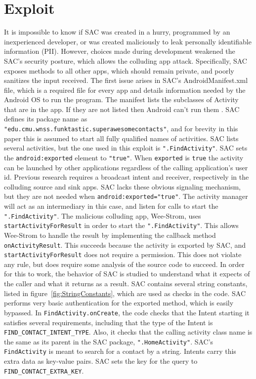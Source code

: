 \documentclass[conference,compsoc]{IEEEtran}
\begin{document}
\section{Exploit}
It is impossible to know if SAC was created in a hurry, programmed by an inexperienced developer, or was created maliciously to leak personally identifiable information (PII). However, choices made during development weakened the SAC's security posture, which allows the colluding app attack. Specifically, SAC exposes methods to all other apps, which should remain private, and poorly sanitizes the input received.
\newline
\indent The first issue arises in SAC's AndroidManifest.xml file, which is a required file for every app and details information needed by the Android OS to run the program\cite{Google:AppManifest}. The manifest lists the subclasses of Activity that are in the app. If they are not listed then Android can't run them \cite{Google:ActivityElement}. SAC defines its package name as \texttt{"edu.cmu.wnss.\-funktastic.\-superawesomecontacts"}, and for brevity in this paper this is assumed to start all fully qualified names of activities.
\newline
\indent	SAC lists several activities, but the one used in this exploit is \texttt{".FindActivity"}. SAC sets the \texttt{android:exported} element to \texttt{"true"}. When \texttt{exported} is \texttt{true} the activity can be launched by other applications regardless of the calling application's user id\cite{Google:ActivityElement}. Previous research requires a broadcast intent and receiver, respectively in the colluding source and sink apps\cite{marforio2010application}. SAC lacks these obvious signaling mechanism, but they are not needed when \texttt{android:exported="true"}. The activity manager will act as an intermediary in this case, and listen for calls to start the \texttt{".FindActivity"}.
\newline
\indent The malicious colluding app, Wee-Strom, uses \texttt{startActivityForResult} in order to start the \texttt{".FindActivity"}. This allows Wee-Strom to handle the result by implementing the callback method \texttt{onActivityResult}\cite{Google:startActivityForResult}. This succeeds because the activity is exported by SAC, and \texttt{startActivityForResult} does not require a permission. This does not violate any rule, but does require some analysis of the source code to succeed.
\newline
\indent In order for this to work, the behavior of SAC is studied to understand what it expects of the caller and what it returns as a result. SAC contains several string constants, listed in figure~\ref{fig:StringConstants}, which are used as checks in the code. SAC performs very basic authentication for the exported method, which is easily bypassed. In \texttt{FindActivity.onCreate}, the code checks that the Intent starting it satisfies several requirements, including that the type of the Intent is \texttt{FIND\_CONTACT\_INTENT\_TYPE}. Also, it checks that the calling activity class name is the same as its parent in the SAC package, \texttt{".HomeActivity"}. SAC's \texttt{FindActivity} is meant to search for a contact by a string. Intents carry this extra data as key-value pairs. SAC sets the key for the query to \texttt{FIND\_CONTACT\_EXTRA\_KEY}. 
\end{document}
